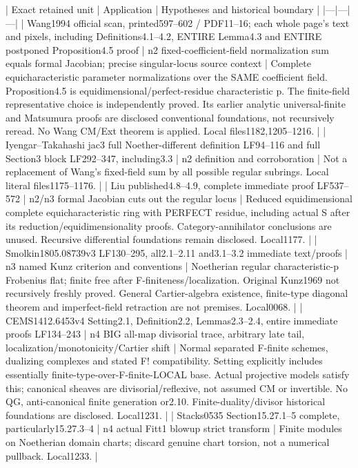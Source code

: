 \documentclass[11pt]{article}
\begin{document}
| Exact retained unit | Application | Hypotheses and historical boundary |
|---|---|---|
| Wang1994 official scan, printed597--602 / PDF11--16; each whole page's text and pixels, including Definitions4.1--4.2, ENTIRE Lemma4.3 and ENTIRE postponed Proposition4.5 proof | n2 fixed-coefficient-field normalization sum equals formal Jacobian; precise singular-locus source context | Complete equicharacteristic parameter normalizations over the SAME coefficient field. Proposition4.5 is equidimensional/perfect-residue characteristic p. The finite-field representative choice is independently proved. Its earlier analytic universal-finite and Matsumura proofs are disclosed conventional foundations, not recursively reread. No Wang CM/Ext theorem is applied. Local files1182,1205--1216. |
| Iyengar--Takahashi jac3 full Noether-different definition LF94--116 and full Section3 block LF292--347, including3.3 | n2 definition and corroboration | Not a replacement of Wang's fixed-field sum by all possible regular subrings. Local literal files1175--1176. |
| Liu published4.8--4.9, complete immediate proof LF537--572 | n2/n3 formal Jacobian cuts out the regular locus | Reduced equidimensional complete equicharacteristic ring with PERFECT residue, including actual S after its reduction/equidimensionality proofs. Category-annihilator conclusions are unused. Recursive differential foundations remain disclosed. Local1177. |
| Smolkin1805.08739v3 LF130--295, all2.1--2.11 and3.1--3.2 immediate text/proofs | n3 named Kunz criterion and conventions | Noetherian regular characteristic-p Frobenius flat; finite free after F-finiteness/localization. Original Kunz1969 not recursively freshly proved. General Cartier-algebra existence, finite-type diagonal theorem and imperfect-field retraction are not premises. Local0068. |
| CEMS1412.6453v4 Setting2.1, Definition2.2, Lemmas2.3--2.4, entire immediate proofs LF134--243 | n4 BIG all-map divisorial trace, arbitrary late tail, localization/monotonicity/Cartier shift | Normal separated F-finite schemes, dualizing complexes and stated F! compatibility. Setting explicitly includes essentially finite-type-over-F-finite-LOCAL base. Actual projective models satisfy this; canonical sheaves are divisorial/reflexive, not assumed CM or invertible. No QG, anti-canonical finite generation or2.10. Finite-duality/divisor historical foundations are disclosed. Local1231. |
| Stacks0535 Section15.27.1--5 complete, particularly15.27.3--4 | n4 actual Fitt1 blowup strict transform | Finite modules on Noetherian domain charts; discard genuine chart torsion, not a numerical pullback. Local1233. |
\end{document}
